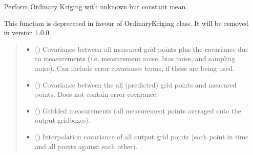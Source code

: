 \documentclass[letterpaper,10pt,english]{sphinxmanual}
\begin{document}
\begin{fulllineitems}
\label{\detokenize{kriging:glomar_gridding.kriging.kriging_ordinary}}
\pysigstartsignatures
\pysiglinewithargsret
{}
{\sphinxparamcomma {}\sphinxparamcomma {}\sphinxparamcomma {}}
{}
\pysigstopsignatures
\sphinxAtStartPar
Perform Ordinary Kriging with unknown but constant mean.

\sphinxAtStartPar
This function is deprecated in favour of OrdinaryKriging class. It will be
removed in version 1.0.0.
\begin{quote}\begin{description}
\begin{itemize}
\item {}
\sphinxAtStartPar
{} () \textendash{} Covariance between all measured grid points plus the covariance due to
measurements (i.e. measurement noise, bias noise, and sampling noise).
Can include error covariance terms, if these are being used.

\item {}
\sphinxAtStartPar
{} () \textendash{} Covariance between the all (predicted) grid points and measured points.
Does not contain error covarance.

\item {}
\sphinxAtStartPar
{} () \textendash{} Gridded measurements (all measurement points averaged onto the output
gridboxes).

\item {}
\sphinxAtStartPar
{} () \textendash{} Interpolation covariance of all output grid points (each point in time
and all points against each other).

\end{itemize}

\sphinxAtStartPar
{}


\end{description}
\end{quote}
\end{fulllineitems}
\end{document}
